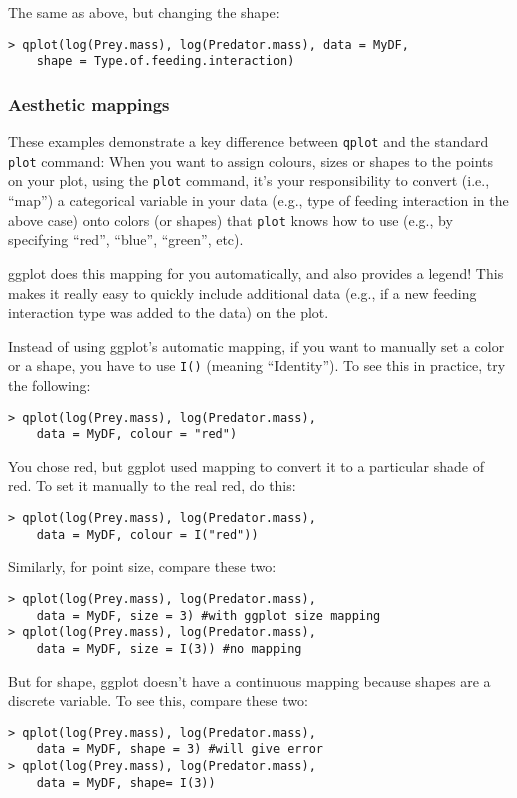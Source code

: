 The same as above, but changing the shape:
\begin{lstlisting}
> qplot(log(Prey.mass), log(Predator.mass), data = MyDF, 
	shape = Type.of.feeding.interaction)
\end{lstlisting}

\subsubsection{Aesthetic mappings}
These examples demonstrate a key difference between {\tt qplot} and the 
standard {\tt plot} command: When you want to assign colours, sizes or 
shapes to the points on your plot, using the {\tt plot} command, it's 
your responsibility to convert (i.e., ``map'') a categorical variable 
in your data (e.g., type of feeding interaction in the above case) onto 
colors (or shapes) that {\tt plot} knows how to use (e.g., by 
specifying ``red'', ``blue'', ``green'', etc). 

ggplot does this mapping for you automatically, and also provides a 
legend! This makes it really easy to quickly include additional data 
(e.g., if a new feeding interaction type was added to the data) on the 
plot. 

Instead of using ggplot's automatic mapping, if you want to  manually 
set a color or a shape, you have to use {\tt I()} (meaning 
``Identity''). To see this in practice, try the following:
\begin{lstlisting}
> qplot(log(Prey.mass), log(Predator.mass), 
	data = MyDF, colour = "red")
\end{lstlisting}
You chose red, but ggplot used mapping to convert it to a particular 
shade of red. To set it manually to the real red, do this:
\begin{lstlisting}
> qplot(log(Prey.mass), log(Predator.mass), 
	data = MyDF, colour = I("red"))
\end{lstlisting}

Similarly, for point size, compare these two:
\begin{lstlisting}
> qplot(log(Prey.mass), log(Predator.mass), 
	data = MyDF, size = 3) #with ggplot size mapping
> qplot(log(Prey.mass), log(Predator.mass), 
	data = MyDF, size = I(3)) #no mapping
\end{lstlisting}

But for shape, ggplot doesn't have a continuous mapping because shapes 
are a discrete variable. To see this, compare these two:
\begin{lstlisting}
> qplot(log(Prey.mass), log(Predator.mass), 
	data = MyDF, shape = 3) #will give error
> qplot(log(Prey.mass), log(Predator.mass), 
	data = MyDF, shape= I(3))
\end{lstlisting}

